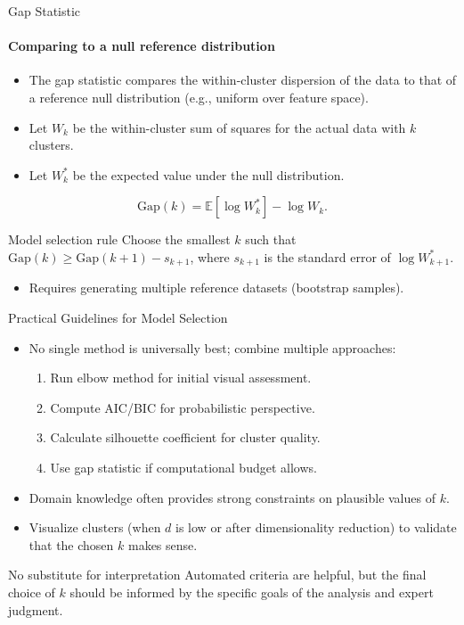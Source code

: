 \begin{frame}{Gap Statistic}
  \framesubtitle{Comparing to a null reference distribution}
  \begin{itemize}
    \item The \alert{gap statistic} compares the within-cluster dispersion of the data to
          that of a reference null distribution (e.g., uniform over feature space).
    \item Let $W_k$ be the within-cluster sum of squares for the actual data with $k$ clusters.
    \item Let $W_k^*$ be the expected value under the null distribution.
  \end{itemize}
  \[
  \text{Gap}(k) = \mathbb{E}[\log W_k^*] - \log W_k.
  \]
  \begin{block}{Model selection rule}
    Choose the \alert{smallest} $k$ such that $\text{Gap}(k) \geq \text{Gap}(k+1) - s_{k+1}$,
    where $s_{k+1}$ is the standard error of $\log W_{k+1}^*$.
  \end{block}
  \begin{itemize}
    \item Requires generating multiple reference datasets (bootstrap samples).
  \end{itemize}
\end{frame}

\begin{frame}{Practical Guidelines for Model Selection}
  \begin{itemize}
    \item No single method is universally best; combine multiple approaches:
      \begin{enumerate}
        \item Run elbow method for initial visual assessment.
        \item Compute AIC/BIC for probabilistic perspective.
        \item Calculate silhouette coefficient for cluster quality.
        \item Use gap statistic if computational budget allows.
      \end{enumerate}
    \item \alert{Domain knowledge} often provides strong constraints on plausible values of $k$.
    \item Visualize clusters (when $d$ is low or after dimensionality reduction) to validate
          that the chosen $k$ makes sense.
  \end{itemize}
  \begin{alertblock}{No substitute for interpretation}
    Automated criteria are helpful, but the final choice of $k$ should be informed by the
    specific goals of the analysis and expert judgment.
  \end{alertblock}
\end{frame}

